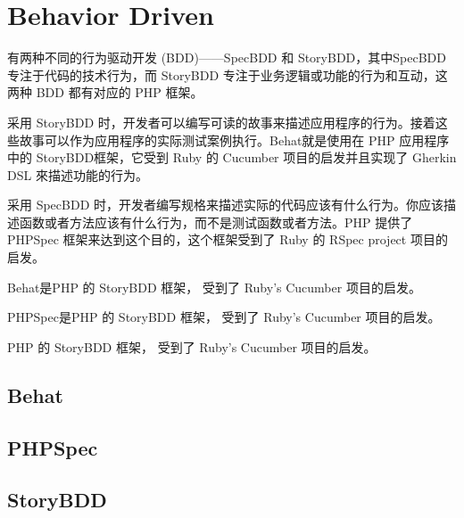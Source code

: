 \section{Behavior Driven}

有两种不同的行为驱动开发 (BDD)——SpecBDD 和 StoryBDD，其中SpecBDD 专注于代码的技术行为，而 StoryBDD 专注于业务逻辑或功能的行为和互动，这两种 BDD 都有对应的 PHP 框架。


采用 StoryBDD 时，开发者可以编写可读的故事来描述应用程序的行为。接着这些故事可以作为应用程序的实际测试案例执行。Behat就是使用在 PHP 应用程序中的 StoryBDD框架，它受到 Ruby 的 Cucumber 项目的启发并且实现了 Gherkin DSL 來描述功能的行为。


采用 SpecBDD 时，开发者编写规格来描述实际的代码应该有什么行为。你应该描述函数或者方法应该有什么行为，而不是测试函数或者方法。PHP 提供了 PHPSpec 框架来达到这个目的，这个框架受到了 Ruby 的 RSpec project 项目的启发。

\begin{compactitem}
\item Behat是PHP 的 StoryBDD 框架， 受到了 Ruby’s Cucumber 项目的启发。
\item PHPSpec是PHP 的 StoryBDD 框架， 受到了 Ruby’s Cucumber 项目的启发。
\item PHP 的 StoryBDD 框架， 受到了 Ruby’s Cucumber 项目的启发。
\end{compactitem}


\subsection{Behat}


\subsection{PHPSpec}


\subsection{StoryBDD}





























